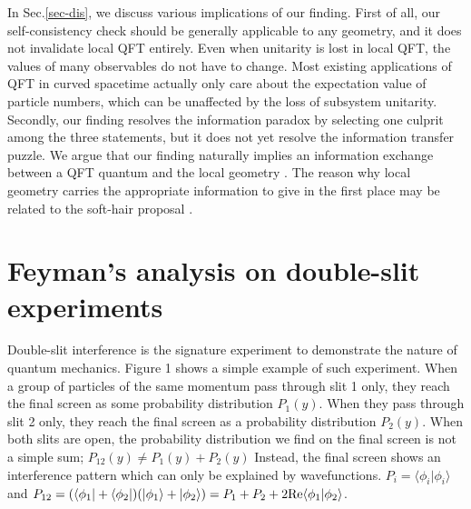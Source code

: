 \documentclass[aps,showpacs,twocolumn,floats,prd,superscriptaddress,nofootinbib]{revtex4-1}
\begin{document}
In Sec.\ref{sec-dis}, we discuss various implications of our finding. 
First of all, our self-consistency check should be generally applicable to any geometry, and it does not invalidate local QFT entirely. 
Even when unitarity is lost in local QFT, the values of many observables do not have to change. 
Most existing applications of QFT in curved spacetime actually only care about the expectation value of particle numbers, which can be unaffected by the loss of subsystem unitarity. 
Secondly, our finding resolves the information paradox by selecting one culprit among the three statements, but it does not yet resolve the information transfer puzzle. 
We argue that our finding naturally implies an information exchange between a QFT quantum and the local geometry \cite{OsuPag16}.
The reason why local geometry carries the appropriate information to give in the first place may be related to the soft-hair proposal \cite{HawPer16}. 

\section{Feyman's analysis on double-slit experiments}
\label{sec-DoubleSlit}

Double-slit interference is the signature experiment to demonstrate the nature of quantum mechanics. Figure 1 shows a simple example of such experiment.
When a group of particles of the same momentum pass through slit 1 only, they reach the final screen as some probability distribution $P_1(y)$. 
When they pass through slit 2 only, they reach the final screen as a probability distribution $P_2(y)$.
When both slits are open, the probability distribution we find on the final screen is not a simple sum; $P_{12}(y) \neq P_1(y) + P_2(y)$
Instead, the final screen shows an interference pattern which can only be explained by wavefunctions.
$P_i = \langle \phi_i | \phi_i \rangle$ and $P_{12} = (\langle \phi_1|+\langle \phi_2| ) (|\phi_1\rangle + | \phi_2 \rangle)=P_1 + P_2 + 2{\rm Re}\langle\phi_1|\phi_2\rangle$.
\end{document}
